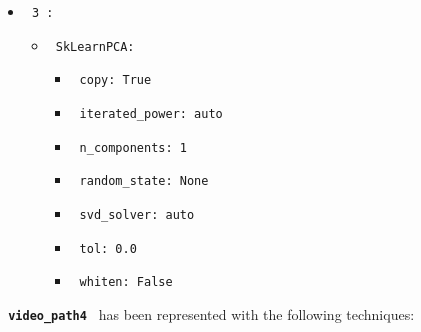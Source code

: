 \documentclass[11pt]{article}
\begin{document}
\begin{itemize}
\begin{itemize}
           \end{itemize}
    \item
     \verb| 3 :|
     \begin{itemize}
             \item
            \verb| SkLearnPCA: |

                   \begin{itemize}
                                    \item
                        \verb| copy: True |
                                    \item
                        \verb| iterated_power: auto |
                                    \item
                        \verb| n_components: 1 |
                                    \item
                        \verb| random_state: None |
                                    \item
                        \verb| svd_solver: auto |
                                    \item
                        \verb| tol: 0.0 |
                                    \item
                        \verb| whiten: False |
                            \end{itemize}
       
           \end{itemize}
\end{itemize}
\hfill\break
\hfill\break



\textbf{\lstinline[style=verbatim-text]| video_path4 |} has been represented with the following techniques:
\hfill\break
\hfill\break
\end{document}
